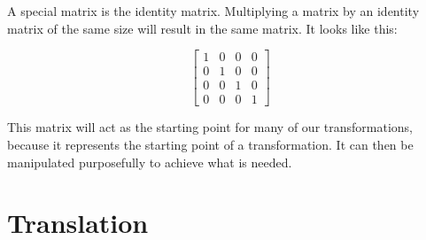 \documentclass{article}
\begin{document}
	A special matrix is the identity matrix. Multiplying a matrix by an identity matrix of the same size will result in the same matrix. It looks like this: \par

	\[
		\begin{bmatrix}
			1 & 0 & 0 & 0 \\
			0 & 1 & 0 & 0 \\
			0 & 0 & 1 & 0 \\
			0 & 0 & 0 & 1
		\end{bmatrix}
	\]
	
	This matrix will act as the starting point for many of our transformations, because it represents the starting point of a transformation. It can then be manipulated purposefully to achieve what is needed.

	\section{Translation}
\end{document}
